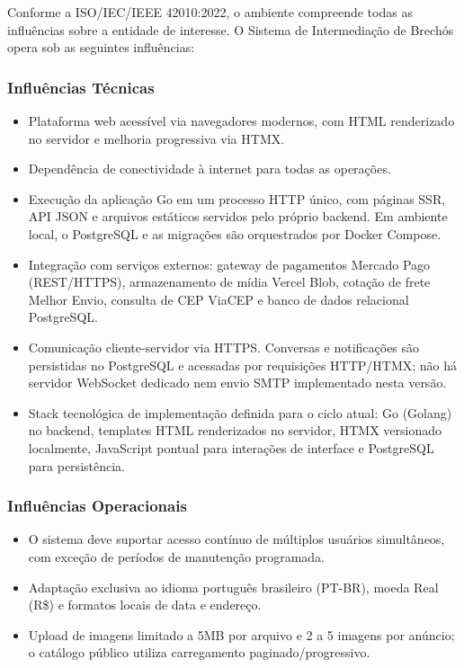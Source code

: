 \documentclass[12pt, a4paper]{article}
\begin{document}
Conforme a ISO/IEC/IEEE 42010:2022, o ambiente compreende todas as influências sobre a entidade de interesse. O Sistema de Intermediação de Brechós opera sob as seguintes influências:

\subsubsection{Influências Técnicas}
\begin{itemize}[noitemsep]
    \item Plataforma web acessível via navegadores modernos, com HTML renderizado no servidor e melhoria progressiva via HTMX.
    \item Dependência de conectividade à internet para todas as operações.
    \item Execução da aplicação Go em um processo HTTP único, com páginas SSR, API JSON e arquivos estáticos servidos pelo próprio backend. Em ambiente local, o PostgreSQL e as migrações são orquestrados por Docker Compose.
    \item Integração com serviços externos: gateway de pagamentos Mercado Pago (REST/HTTPS), armazenamento de mídia Vercel Blob, cotação de frete Melhor Envio, consulta de CEP ViaCEP e banco de dados relacional PostgreSQL.
    \item Comunicação cliente-servidor via HTTPS. Conversas e notificações são persistidas no PostgreSQL e acessadas por requisições HTTP/HTMX; não há servidor WebSocket dedicado nem envio SMTP implementado nesta versão.
    \item Stack tecnológica de implementação definida para o ciclo atual: Go (Golang) no backend, templates HTML renderizados no servidor, HTMX versionado localmente, JavaScript pontual para interações de interface e PostgreSQL para persistência.
\end{itemize}

\subsubsection{Influências Operacionais}
\begin{itemize}[noitemsep]
    \item O sistema deve suportar acesso contínuo de múltiplos usuários simultâneos, com exceção de períodos de manutenção programada.
    \item Adaptação exclusiva ao idioma português brasileiro (PT-BR), moeda Real (R\$) e formatos locais de data e endereço.
    \item Upload de imagens limitado a 5MB por arquivo e 2 a 5 imagens por anúncio; o catálogo público utiliza carregamento paginado/progressivo.
\end{itemize}
\end{document}
